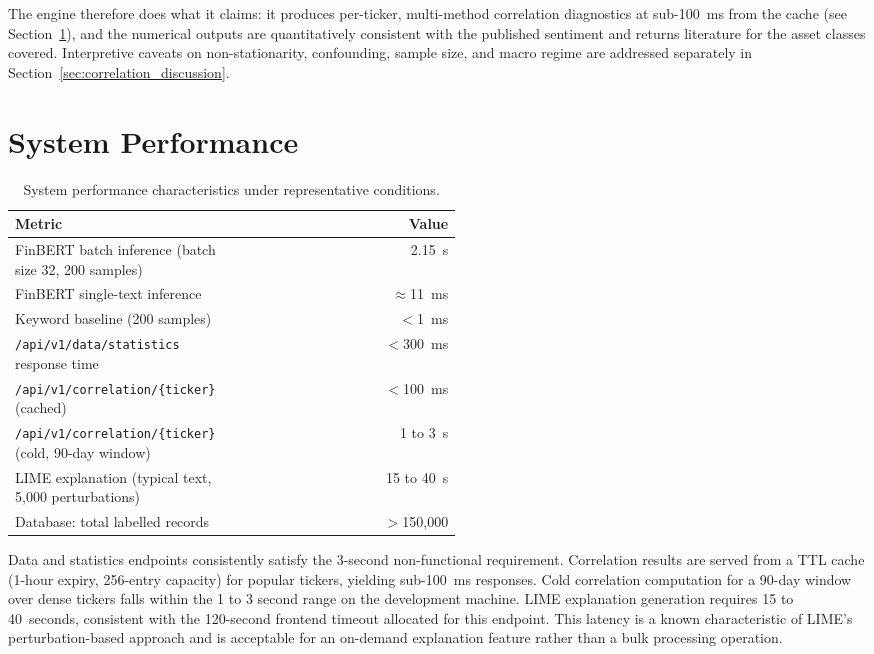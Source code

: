 The engine therefore does what it claims: it produces per-ticker, multi-method correlation diagnostics at sub-100~ms from the cache (see Section~\ref{sec:system_performance}), and the numerical outputs are quantitatively consistent with the published sentiment and returns literature for the asset classes covered. Interpretive caveats on non-stationarity, confounding, sample size, and macro regime are addressed separately in Section~\ref{sec:correlation_discussion}.

\section{System Performance}
\label{sec:system_performance}

\begin{table}[H]
  \centering
  \caption{System performance characteristics under representative conditions.}
  \label{tab:perf}
  \begin{tabular}{@{}>{\raggedright\arraybackslash}p{0.52\linewidth}r@{}}
    \toprule
    \textbf{Metric} & \textbf{Value} \\
    \midrule
    FinBERT batch inference (batch size 32, 200 samples) & 2.15~s \\
    FinBERT single-text inference & $\approx$11~ms \\
    Keyword baseline (200 samples) & $<$1~ms \\
    \texttt{/api/v1/data/statistics} response time & $<$300~ms \\
    \texttt{/api/v1/correlation/\{ticker\}} (cached) & $<$100~ms \\
    \texttt{/api/v1/correlation/\{ticker\}} (cold, 90-day window) & 1 to 3~s \\
    LIME explanation (typical text, 5{,}000 perturbations) & 15 to 40~s \\
    Database: total labelled records & $>$150{,}000 \\
    \bottomrule
  \end{tabular}
\end{table}

Data and statistics endpoints consistently satisfy the 3-second non-functional requirement.  Correlation results are served from a TTL cache (1-hour expiry, 256-entry capacity) for popular tickers, yielding sub-100~ms responses.  Cold correlation computation for a 90-day window over dense tickers falls within the 1 to 3 second range on the development machine.  LIME explanation generation requires 15 to 40~seconds, consistent with the 120-second frontend timeout allocated for this endpoint.  This latency is a known characteristic of LIME's perturbation-based approach and is acceptable for an on-demand explanation feature rather than a bulk processing operation.

